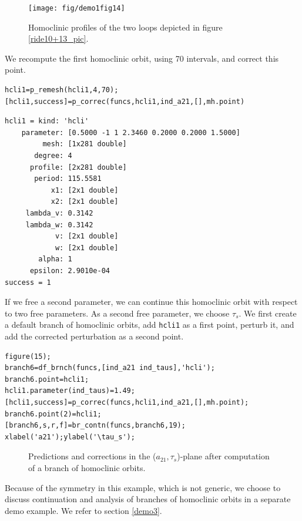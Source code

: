 \documentclass[10pt]{scrartcl}
\begin{document}
\begin{figure}[h]
\begin{center}
\texttt{[image: fig/demo1fig14]}
\end{center}
\caption{\label{ride14_pic}Homoclinic profiles of the two loops
depicted in figure \ref{ride10+13_pic}.}
\end{figure}
We recompute the first homoclinic orbit, using 70 intervals, and correct this point.
\begin{lstlisting}
hcli1=p_remesh(hcli1,4,70);
[hcli1,success]=p_correc(funcs,hcli1,ind_a21,[],mh.point)
\end{lstlisting}
{\small
\begin{verbatim}
hcli1 = kind: 'hcli'
    parameter: [0.5000 -1 1 2.3460 0.2000 0.2000 1.5000]
         mesh: [1x281 double]
       degree: 4
      profile: [2x281 double]
       period: 115.5581
           x1: [2x1 double]
           x2: [2x1 double]
     lambda_v: 0.3142
     lambda_w: 0.3142
            v: [2x1 double]
            w: [2x1 double]
        alpha: 1
      epsilon: 2.9010e-04
success = 1
\end{verbatim}}
If we free a second parameter, we can continue this homoclinic orbit with 
respect to two free parameters.  As a second free parameter, 
we choose $\tau_s$. We first create a default branch of homoclinic orbits,
add \verb#hcli1# as a first point, perturb it, and add the corrected
perturbation as a second point.
\begin{lstlisting}
figure(15);
branch6=df_brnch(funcs,[ind_a21 ind_taus],'hcli');
branch6.point=hcli1;
hcli1.parameter(ind_taus)=1.49;
[hcli1,success]=p_correc(funcs,hcli1,ind_a21,[],mh.point);
branch6.point(2)=hcli1;
[branch6,s,r,f]=br_contn(funcs,branch6,19);
xlabel('a21');ylabel('\tau_s');  
\end{lstlisting}
\begin{figure}[h]
\begin{center}
\end{center}
\caption{\label{ride15_pic}Predictions and corrections in the 
($a_{21},\tau_s$)-plane after computation of a branch of homoclinic 
orbits.}
\end{figure}
Because of the symmetry in this example, which is not generic, we choose to 
discuss continuation and analysis of branches of homoclinic orbits in a 
separate demo example.  We refer to section \ref{demo3}.
\end{document}

